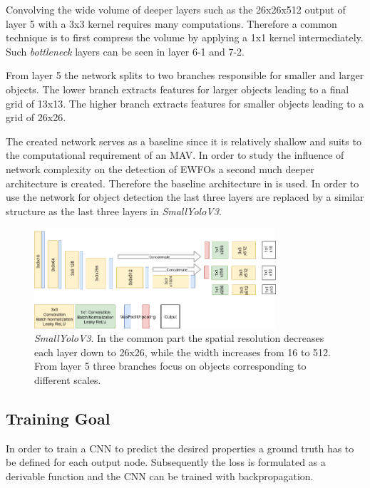 Convolving the wide volume of deeper layers such as the 26x26x512  output of layer 5 with a 3x3 kernel requires many computations. Therefore a common technique is to first compress the volume by applying a 1x1 kernel intermediately. Such \textit{bottleneck} layers can be seen in layer 6-1 and 7-2.

From layer 5 the network splits to two branches responsible for smaller and larger objects. The lower branch extracts features for larger objects leading to a final grid of 13x13. The higher branch extracts features for smaller objects leading to a grid of 26x26.

The created network serves as a baseline since it is relatively shallow and suits to the computational requirement of an \ac{MAV}. In order to study the influence of network complexity on the detection of \acp{EWFO} a second much deeper architecture is created. Therefore the baseline architecture in  is used. In order to use the network for object detection the last three layers are replaced by a similar structure as the last three layers in \textit{SmallYoloV3}. 

\begin{figure}[hbtp]
	\centering
	\includegraphics[width=0.8\textwidth]{fig/SmallYoloV3}
	\caption{\textit{SmallYoloV3}. In the common part the spatial resolution decreases each layer down to 26x26, while the width increases from 16 to 512. From layer 5 three branches focus on objects corresponding to different scales. }
	\label{fig:tinyyolov3_arch}
\end{figure}

\subsection{Training Goal}

In order to train a \ac{CNN} to predict the desired properties a ground truth has to be defined for each output node. Subsequently the loss is formulated as a derivable function and the \ac{CNN} can be trained with backpropagation.

